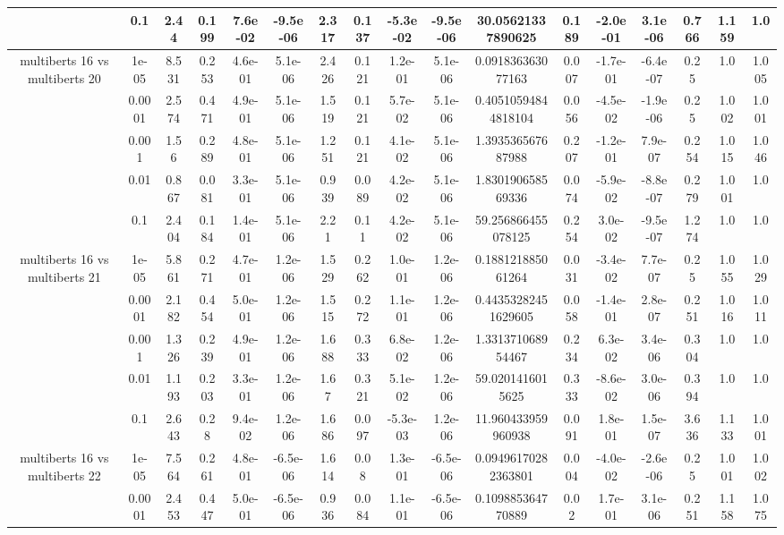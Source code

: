 \begin{tabular}{|c|c|c|c|c|c|c|c|c|c|c|c|c|c|c|c|c|}
 & 0.1 & 2.44 & 0.199 & 7.6e-02 & -9.5e-06 & 2.317 & 0.137 & -5.3e-02 & -9.5e-06 & 30.05621337890625 & 0.189 & -2.0e-01 & 3.1e-06 & 0.766 & 1.159 & 1.0 \\
\hline
\multirow{5}{*}{multiberts 16 vs multiberts 20} & 1e-05 & 8.531 & 0.253 & 4.6e-01 & 5.1e-06 & 2.426 & 0.121 & 1.2e-01 & 5.1e-06 & 0.091836363077163 & 0.007 & -1.7e-01 & -6.4e-07 & 0.25 & 1.0 & 1.005 \\
 & 0.0001 & 2.574 & 0.471 & 4.9e-01 & 5.1e-06 & 1.519 & 0.121 & 5.7e-02 & 5.1e-06 & 0.40510594844818104 & 0.056 & -4.5e-02 & -1.9e-06 & 0.25 & 1.002 & 1.001 \\
 & 0.001 & 1.56 & 0.289 & 4.8e-01 & 5.1e-06 & 1.251 & 0.121 & 4.1e-02 & 5.1e-06 & 1.393536567687988 & 0.207 & -1.2e-01 & 7.9e-07 & 0.254 & 1.015 & 1.046 \\
 & 0.01 & 0.867 & 0.081 & 3.3e-01 & 5.1e-06 & 0.939 & 0.089 & 4.2e-02 & 5.1e-06 & 1.830190658569336 & 0.074 & -5.9e-02 & -8.8e-07 & 0.279 & 1.001 & 1.0 \\
 & 0.1 & 2.404 & 0.184 & 1.4e-01 & 5.1e-06 & 2.21 & 0.11 & 4.2e-02 & 5.1e-06 & 59.256866455078125 & 0.254 & 3.0e-02 & -9.5e-07 & 1.274 & 1.0 & 1.0 \\
\hline
\multirow{5}{*}{multiberts 16 vs multiberts 21} & 1e-05 & 5.861 & 0.271 & 4.7e-01 & 1.2e-06 & 1.529 & 0.262 & 1.0e-01 & 1.2e-06 & 0.188121885061264 & 0.031 & -3.4e-02 & 7.7e-07 & 0.25 & 1.055 & 1.029 \\
 & 0.0001 & 2.182 & 0.454 & 5.0e-01 & 1.2e-06 & 1.515 & 0.272 & 1.1e-01 & 1.2e-06 & 0.44353282451629605 & 0.058 & -1.4e-01 & 2.8e-07 & 0.251 & 1.016 & 1.011 \\
 & 0.001 & 1.326 & 0.239 & 4.9e-01 & 1.2e-06 & 1.688 & 0.333 & 6.8e-02 & 1.2e-06 & 1.331371068954467 & 0.234 & 6.3e-02 & 3.4e-06 & 0.304 & 1.0 & 1.0 \\
 & 0.01 & 1.193 & 0.203 & 3.3e-01 & 1.2e-06 & 1.67 & 0.321 & 5.1e-02 & 1.2e-06 & 59.0201416015625 & 0.333 & -8.6e-02 & 3.0e-06 & 0.394 & 1.0 & 1.0 \\
 & 0.1 & 2.643 & 0.28 & 9.4e-02 & 1.2e-06 & 1.686 & 0.097 & -5.3e-03 & 1.2e-06 & 11.960433959960938 & 0.091 & 1.8e-01 & 1.5e-07 & 3.636 & 1.133 & 1.001 \\
\hline
\multirow{5}{*}{multiberts 16 vs multiberts 22} & 1e-05 & 7.564 & 0.261 & 4.8e-01 & -6.5e-06 & 1.614 & 0.08 & 1.3e-01 & -6.5e-06 & 0.09496170282363801 & 0.004 & -4.0e-02 & -2.6e-06 & 0.25 & 1.001 & 1.002 \\
 & 0.0001 & 2.453 & 0.447 & 5.0e-01 & -6.5e-06 & 0.936 & 0.084 & 1.1e-01 & -6.5e-06 & 0.109885364770889 & 0.02 & 1.7e-01 & 3.1e-06 & 0.251 & 1.158 & 1.075 \\

\end{tabular}
